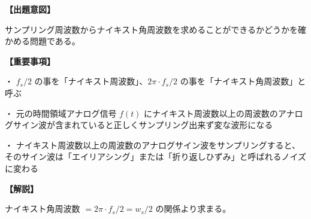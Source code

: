 \noindent \textbf{【出題意図】}

\noindent サンプリング周波数からナイキスト角周波数を求めることができるかどうかを確かめる問題である。

\vspace{1em}
\noindent \textbf{【重要事項】}

\medskip
\noindent ・ $f_s/2$ の事を「ナイキスト周波数」、$2\pi \cdot f_s/2$ の事を「ナイキスト角周波数」と呼ぶ

\medskip
\noindent ・ 元の時間領域アナログ信号 $f(t)$ にナイキスト周波数以上の周波数のアナログサイン波が含まれていると正しくサンプリング出来ず変な波形になる

\medskip
\noindent ・ ナイキスト周波数以上の周波数のアナログサイン波をサンプリングすると、そのサイン波は「エイリアシング」または「折り返しひずみ」と呼ばれるノイズに変わる

\vspace{1em}
\noindent \textbf{【解説】}

\noindent ナイキスト角周波数 $ = 2\pi \cdot f_s/2 = w_s/2$ の関係より求まる。
